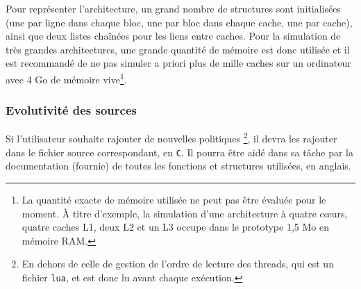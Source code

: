 Pour représenter l'architecture, un grand nombre de structures sont initialisées (une par ligne dans chaque bloc, une par bloc dans chaque cache, une par cache), ainsi que deux listes chaînées pour les liens entre caches. Pour la simulation de très grandes architectures, une grande quantité de mémoire est donc utilisée et il est recommandé de ne pas simuler a priori plus de mille caches sur un ordinateur avec 4 Go de mémoire vive\footnote{La quantité exacte de mémoire utilisée ne peut pas être évaluée pour le moment. \`A titre d'exemple, la simulation d'une architecture à quatre c\oe urs, quatre caches L1, deux L2 et un L3 occupe dans le prototype 1,5 Mo en mémoire RAM.}.

\subsubsection{Evolutivité des sources}

Si l'utilisateur souhaite rajouter de nouvelles politiques \footnote{En dehors de celle de gestion de l'ordre de lecture des threads, qui est un fichier \texttt{lua}, et est donc lu avant chaque exécution.}, il devra les rajouter dans le fichier source correspondant, en \texttt{C}. Il pourra être aidé dans sa tâche par la documentation (fournie) de toutes les fonctions et structures utilisées, en anglais.
